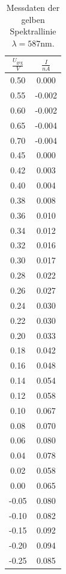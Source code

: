 \documentclass[
  bibliography=totoc,     %
  captions=tableheading,  %
  titlepage=firstiscover, %
]{scrartcl}
\begin{document}
\begin{table} [H]
	\centering
	\caption{Messdaten der gelben Spektrallinie $\lambda = 587 \text{nm}$.}
	\label{tab:gelb}
	\begin{tabular}{c|c}
		\toprule
		{$\frac{U_\text{geg}}{V}$}&{$\frac{I}{nA}$} \\
		\midrule
		0.50 &0.000\\
		0.55 &-0.002\\
		0.60 &-0.002\\
		0.65 &-0.004\\
		0.70 &-0.004\\
		0.45 &0.000\\
		0.42 &0.003\\
		0.40 &0.004\\
		0.38 &0.008\\
		0.36 &0.010\\
		0.34 &0.012\\
		0.32 &0.016\\
		0.30 &0.017\\
		0.28 &0.022\\
		0.26 &0.027\\
		0.24 &0.030\\
		0.22 &0.030\\
		0.20 &0.033\\
		0.18 &0.042\\
		0.16 &0.048\\
		0.14 &0.054\\
		0.12 &0.058\\
		0.10 &0.067\\
		0.08 &0.070\\
		0.06 &0.080\\
		0.04 &0.078\\
		0.02 &0.058\\
		0.00 &0.065\\
		-0.05 &0.080\\
		-0.10 &0.082\\
		-0.15 &0.092\\
		-0.20 &0.094\\
		-0.25 &0.085\\
		\bottomrule 
	\end{tabular}
\end{table} 
\end{document}
